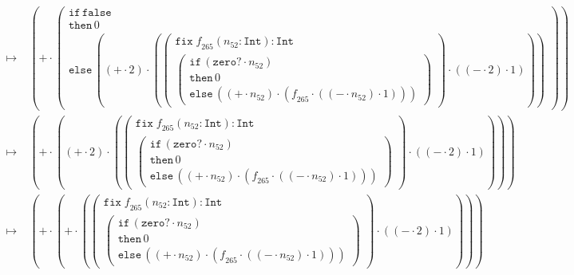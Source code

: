 \documentclass{article}
\begin{document}
\begin{align*}
\longmapsto &\;\left(\mathtt{+}\cdot \left(\begin{array}{l}\mathtt{if}\,\mathtt{false}\\\mathtt{then}\,0\\\mathtt{else}\,\left(\left(\mathtt{+}\cdot 2\right)\cdot \left(\left(\begin{array}{l} \mathtt{fix}\; \mathit{f}_{265}(\mathit{n}_{52}:\mathtt{Int}): \mathtt{Int}\\\left(\begin{array}{l}\mathtt{if}\,\left(\mathtt{zero?}\cdot \mathit{n}_{52}\right)\\\mathtt{then}\,0\\\mathtt{else}\,\left(\left(\mathtt{+}\cdot \mathit{n}_{52}\right)\cdot \left(\mathit{f}_{265}\cdot \left(\left(\mathtt{-}\cdot \mathit{n}_{52}\right)\cdot 1\right)\right)\right)\end{array}\right)\end{array}\right)\cdot \left(\left(\mathtt{-}\cdot 2\right)\cdot 1\right)\right)\right)\end{array}\right)\right)\\ 
\longmapsto &\;\left(\mathtt{+}\cdot \left(\left(\mathtt{+}\cdot 2\right)\cdot \left(\left(\begin{array}{l} \mathtt{fix}\; \mathit{f}_{265}(\mathit{n}_{52}:\mathtt{Int}): \mathtt{Int}\\\left(\begin{array}{l}\mathtt{if}\,\left(\mathtt{zero?}\cdot \mathit{n}_{52}\right)\\\mathtt{then}\,0\\\mathtt{else}\,\left(\left(\mathtt{+}\cdot \mathit{n}_{52}\right)\cdot \left(\mathit{f}_{265}\cdot \left(\left(\mathtt{-}\cdot \mathit{n}_{52}\right)\cdot 1\right)\right)\right)\end{array}\right)\end{array}\right)\cdot \left(\left(\mathtt{-}\cdot 2\right)\cdot 1\right)\right)\right)\right)\\ 
\longmapsto &\;\left(\mathtt{+}\cdot \left(\mathtt{+}\cdot \left(\left(\begin{array}{l} \mathtt{fix}\; \mathit{f}_{265}(\mathit{n}_{52}:\mathtt{Int}): \mathtt{Int}\\\left(\begin{array}{l}\mathtt{if}\,\left(\mathtt{zero?}\cdot \mathit{n}_{52}\right)\\\mathtt{then}\,0\\\mathtt{else}\,\left(\left(\mathtt{+}\cdot \mathit{n}_{52}\right)\cdot \left(\mathit{f}_{265}\cdot \left(\left(\mathtt{-}\cdot \mathit{n}_{52}\right)\cdot 1\right)\right)\right)\end{array}\right)\end{array}\right)\cdot \left(\left(\mathtt{-}\cdot 2\right)\cdot 1\right)\right)\right)\right)\\ 

\end{align*}
\end{document}
